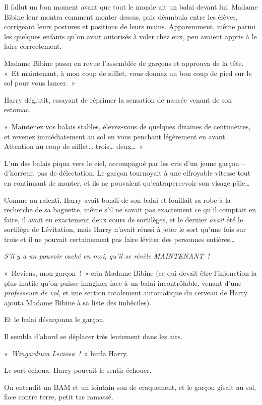 Il fallut un bon moment avant que tout le monde ait un balai devant lui.
Madame Bibine leur montra comment monter dessus, puis déambula entre les élèves, corrigeant leurs postures et positions de leurs mains.
Apparemment, même parmi les quelques enfants qu'on avait autorisés à voler chez eux, peu avaient appris à le faire correctement.

Madame Bibine passa en revue l'assemblée de garçons et approuva de la tête.
«~Et maintenant, à mon coup de sifflet, vous donnez un bon coup de pied sur le sol pour vous lancer.~»

Harry déglutit, essayant de réprimer la sensation de nausée venant de son estomac.

«~Maintenez vos balais stables, élevez-vous de quelques dizaines de centimètres, et revenez immédiatement au sol en vous penchant légèrement en avant.
Attention au coup de sifflet… trois… deux…~»

L'un des balais piqua vers le ciel, accompagné par les cris d'un jeune garçon -- d'horreur, pas de délectation.
Le garçon tournoyait à une effroyable vitesse tout en continuant de monter, et ils ne pouvaient qu'entrapercevoir son visage pâle…

Comme au ralenti, Harry avait bondi de son balai et fouillait sa robe à la recherche de sa baguette, même s'il ne savait pas exactement ce qu'il comptait en faire, il avait eu exactement deux cours de sortilèges, et le dernier \emph{avait} été le sortilège de Lévitation, mais Harry n'avait réussi à jeter le sort qu'une fois sur trois et il ne pouvait certainement pas faire léviter des personnes entières…

\emph{S'il y a un pouvoir caché en moi, qu'il se révèle MAINTENANT~!}

«~Reviens, mon garçon~!~» cria Madame Bibine (ce qui devait être l'injonction la plus inutile qu'on puisse imaginer face à un balai incontrôlable, venant d'une \emph{professeure de vol}, et une section totalement automatique du cerveau de Harry ajouta Madame Bibine à sa liste des imbéciles).

Et le balai désarçonna le garçon.

Il sembla d'abord se déplacer très lentement dans les airs.

«~\emph{Wingardium Leviosa~!}~» hurla Harry.

Le sort échoua. Harry pouvait le sentir échouer.

On entendit un BAM et un lointain son de craquement, et le garçon gisait au sol, face contre terre, petit tas ramassé.

